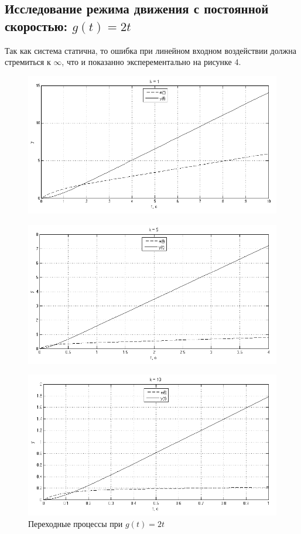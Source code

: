 \documentclass[a4paper, 11pt, russian]{article}
\begin{document}
    \subsection{Исследование режима движения с постоянной скоростью: $g(t) = 2t$}
    Так как система статична, то ошибка при линейном входном воздействии должна стремиться к $\infty$, что и показанно эксперементально на рисунке 4.
    
    \begin{figure}[h!]
        \centering
        \includegraphics[scale = 0.75]{vInput0ast1k.png}
    \end{figure}
    \begin{figure}[h!]
        \centering
        \includegraphics[scale = 0.75]{vInput0ast5k.png}
    \end{figure}
    \begin{figure}[ht!]
        \centering
        \includegraphics[scale = 0.75]{vInput0ast10k.png}
        \caption{Переходные процессы при $g(t) = 2t$}
    \end{figure}
    \clearpage
\end{document}
